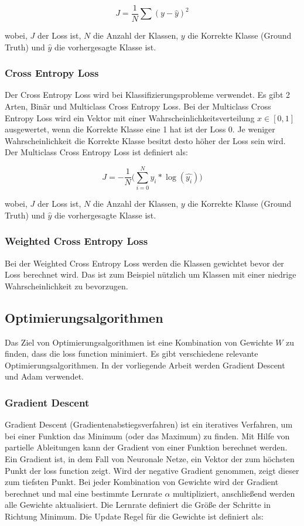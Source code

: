 \begin{equation}
  J = \frac{1}{N} \sum (y - \hat{y})^2
\end{equation}

wobei, $J$ der Loss ist, $N$ die Anzahl der Klassen, $y$ die Korrekte Klasse (Ground Truth) und $ \hat{y}$ die vorhergesagte Klasse ist.

\subsubsection{Cross Entropy Loss}
Der Cross Entropy Loss wird bei Klassifizierungsprobleme verwendet. Es gibt 2 Arten, Binär und Multiclass Cross Entropy Loss. 
Bei der Multiclass Cross Entropy Loss wird ein Vektor mit einer Wahrscheinlichkeitsverteilung $ x \in [0, 1] $ 
ausgewertet, wenn die Korrekte Klasse eine 1 hat ist der Loss 0. Je weniger Wahrscheinlichkeit die Korrekte Klasse besitzt desto höher der Loss 
sein wird. Der Multiclass Cross Entropy Loss ist definiert als: 

\begin{equation}
  J = -\frac{1}{N} \Big(\sum_{i=0}^N y_{i} * \log(\hat{y_{i}})\Big)
\end{equation}

wobei, $J$ der Loss ist, $N$ die Anzahl der Klassen, $y$ die Korrekte Klasse (Ground Truth) und $ \hat{y}$ die vorhergesagte Klasse ist.

\subsubsection{Weighted Cross Entropy Loss}
Bei der Weighted Cross Entropy Loss werden die Klassen gewichtet bevor der Loss berechnet wird. Das ist zum Beispiel nützlich um Klassen  
mit einer niedrige Wahrscheinlichkeit zu bevorzugen.

\subsection{Optimierungsalgorithmen}
Das Ziel von Optimierungsalgorithmen ist eine Kombination von Gewichte $ W $ zu finden, dass die \gls{loss function} minimiert.
Es gibt verschiedene relevante Optimierungsalgorithmen. In der vorliegende Arbeit werden Gradient Descent und Adam verwendet.

\subsubsection{Gradient Descent}
Gradient Descent (Gradientenabstiegsverfahren) ist ein iteratives Verfahren, um bei einer Funktion das Minimum (oder das Maximum) zu finden. 
Mit Hilfe von partielle Ableitungen kann der Gradient von einer Funktion berechnet werden. Ein Gradient ist, in dem Fall von Neuronale 
Netze, ein Vektor der zum höchsten Punkt der \gls{loss function} zeigt. Wird der negative Gradient genommen, zeigt dieser zum tiefsten Punkt.
Bei jeder Kombination von Gewichte wird der Gradient berechnet und mal eine bestimmte Lernrate $ \alpha $ multipliziert, anschließend werden 
alle Gewichte aktualisiert. Die Lernrate definiert die Größe der Schritte in Richtung Minimum. Die Update Regel für die Gewichte ist definiert als:

